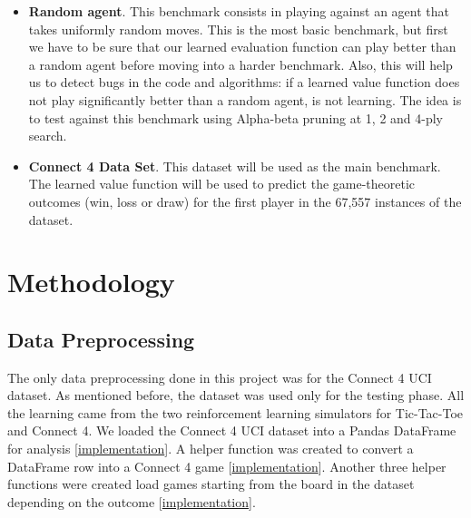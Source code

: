 \documentclass{article}
\newcommand{\GithubURL}[1]{[\href{https://github.com/davidrobles/mlnd-capstone-code/blob/master/#1}{implementation}]}
\begin{document}
\begin{itemize}

    \item \textbf{Random agent}. This benchmark consists in playing against an agent that takes
        uniformly random moves. This is the most basic benchmark, but first we have to be sure that
        our learned evaluation function can play better than a random agent before moving into a
        harder benchmark. Also, this will help us to detect bugs in the code and algorithms: if a
        learned value function does not play significantly better than a random agent, is not
        learning. The idea is to test against this benchmark using Alpha-beta pruning at 1, 2 and
        4-ply search.

    \item \textbf{Connect 4 Data Set}. This dataset will be used as the main benchmark. The learned
        value function will be used to predict the game-theoretic outcomes (win, loss or draw) for
        the first player in the 67,557 instances of the dataset.

\end{itemize}

\pagebreak[4]

\section{Methodology}

\subsection{Data Preprocessing}

The only data preprocessing done in this project was for the Connect 4 UCI dataset. As mentioned
before, the dataset was used only for the testing phase. All the learning came from the two
reinforcement learning simulators for Tic-Tac-Toe and Connect 4. We loaded the Connect 4 UCI dataset
into a Pandas DataFrame for analysis \GithubURL{capstone/datasets/ucic4.py\#6}. A helper function
was created to convert a DataFrame row into a Connect 4 game
\GithubURL{capstone/datasets/ucic4.py\#L24}. Another three helper functions were created load games
starting from the board in the dataset depending on the outcome
\GithubURL{capstone/datasets/ucic4.py\#L49}.
\end{document}
